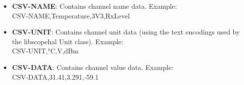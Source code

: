 \begin{itemize}
\item \textbf{CSV-NAME}: Contains channel name data. Example:\\
CSV-NAME,Temperature,3V3,RxLevel

\item \textbf{CSV-UNIT}: Contains channel unit data (using the text encodings used by the libscopehal Unit class). Example:\\
CSV-UNIT,°C,V,dBm

\item \textbf{CSV-DATA}: Contains channel value data. Example:\\
CSV-DATA,31.41,3.291,-59.1

\end{itemize}
